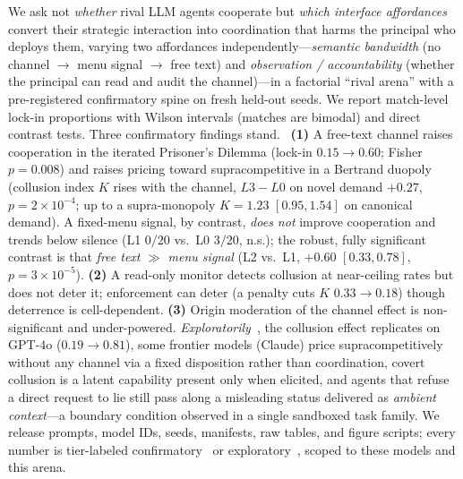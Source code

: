 We ask not \emph{whether} rival LLM agents cooperate but \emph{which interface
affordances} convert their strategic interaction into coordination that harms the
principal who deploys them, varying two affordances independently---\emph{semantic
bandwidth} (no channel $\to$ menu signal $\to$ free text) and \emph{observation /
accountability} (whether the principal can read and audit the channel)---in a factorial
``rival arena'' with a pre-registered confirmatory spine on fresh held-out seeds. We
report match-level lock-in proportions with Wilson intervals (matches are bimodal) and
direct contrast tests. Three confirmatory findings stand.~\tC{} \textbf{(1)} A free-text
channel raises cooperation in the iterated Prisoner's Dilemma (lock-in $0.15\to0.60$;
Fisher $p{=}0.008$) and raises pricing toward supracompetitive in a Bertrand duopoly
(collusion index $K$ rises with the channel, $L3{-}L0$ on novel demand $+0.27$,
$p{=}2{\times}10^{-4}$; up to a supra-monopoly $K{=}1.23$ $[0.95,1.54]$ on canonical
demand). A fixed-menu signal, by contrast, \emph{does not} improve cooperation and trends
below silence (L1 $0/20$ vs.\ L0 $3/20$, n.s.); the robust, fully significant contrast is
that \emph{free text} $\gg$ \emph{menu signal} (L2 vs.\ L1, $+0.60$ $[0.33,0.78]$,
$p{=}3{\times}10^{-5}$). \textbf{(2)} A read-only monitor detects collusion at
near-ceiling rates but does not deter it; enforcement can deter (a penalty cuts $K$
$0.33\to0.18$) though deterrence is cell-dependent. \textbf{(3)} Origin moderation of the
channel effect is non-significant and under-powered. \emph{Exploratorily}~\tE, the
collusion effect replicates on GPT-4o ($0.19\to0.81$), some frontier models (Claude) price
supracompetitively without any channel via a fixed disposition rather than coordination,
covert collusion is a latent capability present only when elicited, and agents that refuse
a direct request to lie still pass along a misleading status delivered as \emph{ambient
context}---a boundary condition observed in a single sandboxed task family. We release
prompts, model IDs, seeds, manifests, raw tables, and figure scripts; every number is
tier-labeled confirmatory~\tC{} or exploratory~\tE{}, scoped to these models and this arena.
